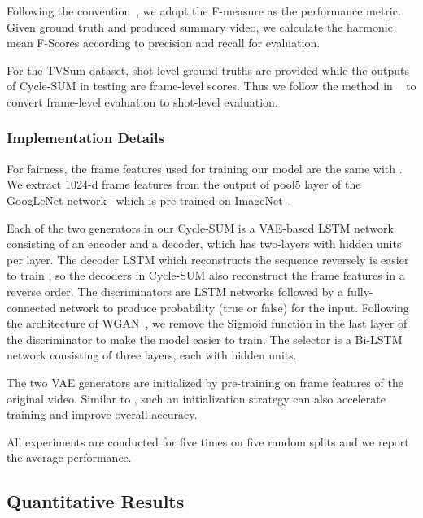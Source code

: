 \documentclass[letterpaper]{article} \usepackage{aaai19}  \usepackage{times}  \usepackage{helvet}  \usepackage{courier}  \usepackage{url}  \usepackage{graphicx}  \frenchspacing  \setlength{\pdfpagewidth}{8.5in}  \setlength{\pdfpageheight}{11in}  \usepackage{amsmath}
\begin{document}
Following the convention~\cite{gygli2015video,zhang2016video,mahasseni2017unsupervised}, we adopt the F-measure as the performance metric. Given ground truth and produced summary video, we calculate the harmonic mean F-Scores according to precision and recall for evaluation.

For the TVSum dataset, shot-level ground truths are provided while the outputs of Cycle-SUM in testing are frame-level scores. Thus we follow the method in ~\cite{zhang2016video} to convert frame-level evaluation to shot-level evaluation. 





\subsubsection{{Implementation Details}}
For fairness, the frame features used for training our model are the same with \cite{zhang2016video,mahasseni2017unsupervised}. We extract 1024-d frame features from the output of pool5 layer of the GoogLeNet network~\cite{szegedy2015going} which is pre-trained on ImageNet~\cite{deng2009imagenet}.

Each of the two generators in our Cycle-SUM is a VAE-based LSTM network consisting of an encoder and a decoder, which has two-layers with  hidden units per layer. The decoder LSTM which reconstructs the sequence reversely is easier to train \cite{srivastava2015unsupervised}, so the decoders in Cycle-SUM also reconstruct the frame features in a reverse order. The discriminators are LSTM networks followed by a fully-connected network to produce probability (true or false) for the input.
Following the architecture of WGAN~\cite{arjovsky2017wasserstein}, we remove the Sigmoid function in the last layer of the discriminator to make the model easier to train. The selector is a Bi-LSTM network consisting of three layers, each with  hidden units.

The two VAE generators are initialized by pre-training on frame features of the original video. Similar to \cite{mahasseni2017unsupervised}, such an initialization strategy can also accelerate training and improve overall accuracy.

All experiments are conducted for five times on five random splits and we report the average performance.

\subsection{Quantitative Results}
\end{document}

